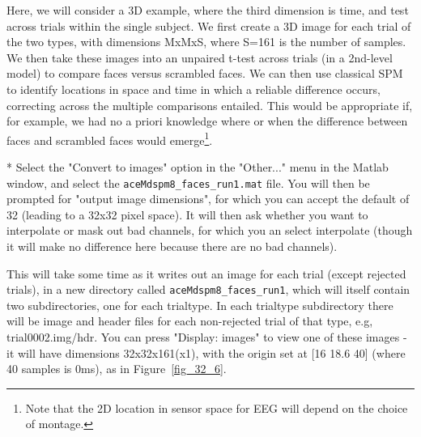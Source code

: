 Here, we will consider a 3D example, where the third dimension is time, and test across trials within the single subject. We first create a 3D image for each trial of the two types, with dimensions MxMxS, where S=161 is the number of samples. We then take these images into an unpaired t-test across trials (in a 2nd-level model) to compare faces versus scrambled faces. We can then use classical SPM to identify locations in space and time in which a reliable difference occurs, correcting across the multiple comparisons entailed. This would be appropriate if, for example, we had no a priori knowledge where or when the difference between faces and scrambled faces would emerge\footnote{Note that the 2D location in sensor space for EEG will depend on the choice of montage.}.

* Select the "Convert to images" option in the "Other..." menu in the Matlab window, and select the \verb!aceMdspm8_faces_run1.mat! file. You will then be prompted for "output image dimensions", for which you can accept the default of 32 (leading to a 32x32 pixel space). It will then ask whether you want to interpolate or mask out bad channels, for which you an select interpolate (though it will make no difference here because there are no bad channels).

This will take some time as it writes out an image for each trial (except rejected trials), in a new directory called \verb!aceMdspm8_faces_run1!, which will itself contain two subdirectories, one for each trialtype. In each trialtype subdirectory there will be image and header files for each non-rejected trial of that type, e.g, trial0002.img/hdr. You can press "Display: images" to view one of these images - it will have dimensions 32x32x161(x1), with the origin set at [16 18.6 40] (where 40 samples is 0ms), as in Figure~\ref{fig_32_6}.


